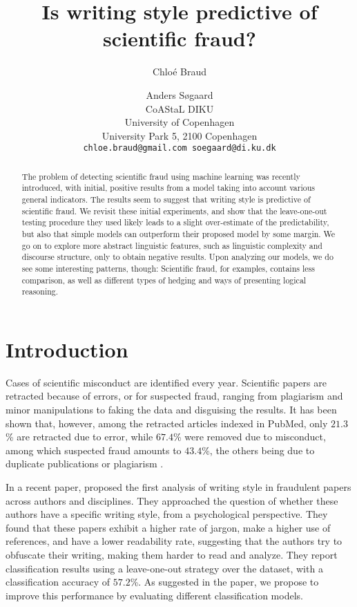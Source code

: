 \documentclass[11pt,letterpaper]{article}
\title{Is writing style predictive of scientific fraud?}
\author{Chlo{\'e} Braud \and Anders S{\o}gaard \\
        CoAStaL DIKU\\University of Copenhagen\\ University Park 5, 2100 Copenhagen\\ {\tt chloe.braud@gmail.com soegaard@di.ku.dk}}
\date{}
\begin{document}
\maketitle

\begin{abstract}
The problem of detecting scientific fraud using machine learning was recently introduced, with initial, positive results from a model taking into account various general indicators.
The results seem to suggest that writing style is predictive of scientific fraud. 
We revisit these initial experiments, and show that the leave-one-out testing procedure they used likely leads to a slight over-estimate of the predictability, 
but also that simple models can outperform their proposed model by some margin. 
We go on to explore more abstract linguistic features, such as linguistic complexity and discourse structure, only to obtain negative results. 
Upon analyzing our models, we do see some interesting patterns, though: Scientific fraud, for examples, contains less comparison, as well as different types of hedging and ways of presenting logical reasoning.

\end{abstract}



\section{Introduction}

Cases of scientific misconduct are identified every year. 
Scientific papers are retracted because of errors, or for suspected fraud, ranging from plagiarism and minor manipulations to faking the data and disguising the results. 
It has been shown that, however, among the retracted articles indexed in PubMed, only $21.3$\% are retracted due to error, while $67.4$\% were removed due to misconduct, among which suspected fraud amounts to $43.4$\%, the others being due to duplicate publications or plagiarism \cite{fang:misconduct:12}.

In a recent paper,  proposed the first analysis of writing style in fraudulent papers across authors and disciplines.
They approached the question of whether these authors have a specific writing style, from a psychological perspective. 
They found that these papers exhibit a higher rate of jargon, make a higher use of references, and have a lower readability rate, suggesting that the authors try to obfuscate their writing, making them harder to read and analyze.
They report classification results using a leave-one-out strategy over the dataset, with a classification accuracy of $57.2$\%. 
As suggested in the paper, we propose to improve this performance by evaluating different classification models.
\end{document}
